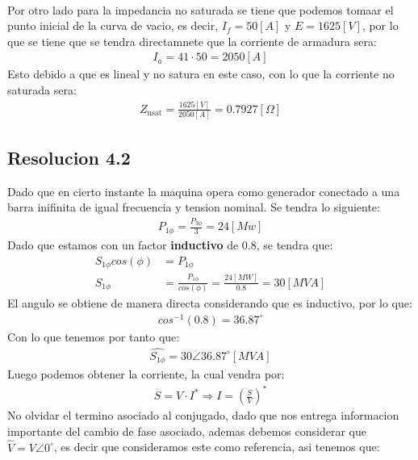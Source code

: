\documentclass[
  11pt,
  letterpaper,
   addpoints,
   answers
  ]{exam}
\begin{document}
\begin{questions}
\begin{solution}
\begin{align}
    \end{align}
    Por otro lado para la impedancia no saturada se tiene que podemos tomaar el punto inicial de la curva de vacio, es decir, $I_{f} = 50[A]$ y $E = 1625[V]$, por lo que se tiene que se tendra directamnete que la corriente de armadura sera:
    \begin{align}
        I_{a} = 41 \cdot 50 = 2050[A]
    \end{align}
    Esto debido a que es lineal y no satura en este caso, con lo que la corriente no saturada sera:
    \begin{align}
        Z_{\text{nsat}} = \frac{1625[V]}{2050[A]} = 0.7927[\Omega]
    \end{align}
    \subsection*{Resolucion 4.2}
    Dado que en cierto instante la maquina opera como generador conectado a una barra inifinita de igual frecuencia y tension nominal. Se tendra lo siguiente:
    \begin{align}
        P_{1\phi} = \frac{P_{3\phi}}{3}= 24[Mw]
    \end{align}
    Dado que estamos con un factor \textbf{inductivo} de 0.8, se tendra que:
    \begin{align}
        S_{1\phi} cos(\phi) &= P_{1\phi}\\
        S_{1\phi} &= \frac{P_{1\phi}}{cos(\phi)} = \frac{24[MW]}{0.8} = 30[MVA] 
    \end{align}
    El angulo se obtiene de manera directa considerando que es inductivo, por lo que:
    \begin{align}
        cos^{-1}(0.8) = 36.87^{\circ}
    \end{align}
    Con lo que tenemos por tanto que:
    \begin{align}
        \hat{S_{1\phi}} = 30 \angle 36.87^{\circ} [MVA]
    \end{align}
    Luego podemos obtener la corriente, la cual vendra por:
    \begin{align}
        \hat{S} = V \cdot I^{*} \Rightarrow I = \left(\frac{S}{V}\right)^{*}
    \end{align}
    No olvidar el termino asociado al conjugado, dado que nos entrega informacion importante del cambio de fase asociado, ademas debemos considerar que $\hat{V} = V\angle 0^{\circ}$, es decir que consideramos este como referencia, asi tenemos que:
    \begin{align}

\end{align}
\end{solution}
\end{questions}
\end{document}
